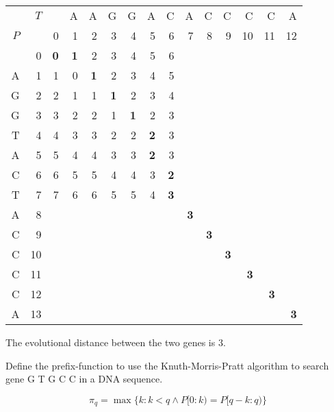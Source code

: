 {\begin{center} \begin{tabular}{r r | rrrrrrrrrrrrr}
        & $T$ &    & A & A & G & G & A & C & A & C & C &  C &  C &  A \\
    $P$ &     &  0 & 1 & 2 & 3 & 4 & 5 & 6 & 7 & 8 & 9 & 10 & 11 & 12 \\ \hline
        &   0 &  \textbf{0} & \textbf{1} & 2 & 3 & 4 & 5 & 6 &   &   &   &    &    &    \\
    A   &   1 &  1 & 0 & \textbf{1} & 2 & 3 & 4 & 5 &   &   &   &    &    &    \\
    G   &   2 &  2 & 1 & 1 & \textbf{1} & 2 & 3 & 4 &   &   &   &    &    &    \\
    G   &   3 &  3 & 2 & 2 & 1 & \textbf{1} & 2 & 3 &   &   &   &    &    &    \\
    T   &   4 &  4 & 3 & 3 & 2 & 2 & \textbf{2} & 3 &   &   &   &    &    &    \\
    A   &   5 &  5 & 4 & 4 & 3 & 3 & \textbf{2} & 3 &   &   &   &    &    &    \\
    C   &   6 &  6 & 5 & 5 & 4 & 4 & 3 & \textbf{2} &   &   &   &    &    &    \\
    T   &   7 &  7 & 6 & 6 & 5 & 5 & 4 & \textbf{3} &   &   &   &    &    &    \\
    A   &   8 &    &   &   &   &   &   &   & \textbf{3} &   &   &    &    &    \\
    C   &   9 &    &   &   &   &   &   &   &   & \textbf{3} &   &    &    &    \\
    C   &  10 &    &   &   &   &   &   &   &   &   & \textbf{3} &    &    &    \\
    C   &  11 &    &   &   &   &   &   &   &   &   &   & \textbf{3} &    &    \\
    C   &  12 &    &   &   &   &   &   &   &   &   &   &    & \textbf{3} &    \\
    A   &  13 &    &   &   &   &   &   &   &   &   &   &    &    & \textbf{3} \\
\end{tabular} \end{center}

The evolutional distance between the two genes is 3.

\newpage
{}
Define the prefix-function to use the Knuth-Morris-Pratt algorithm to search gene G T G C C in a DNA sequence.

\ansseparator

\begin{equation*}
    \pi_q = \max \{k : k < q \wedge P[0:k) = P[q-k:q)\}
\end{equation*}

}
